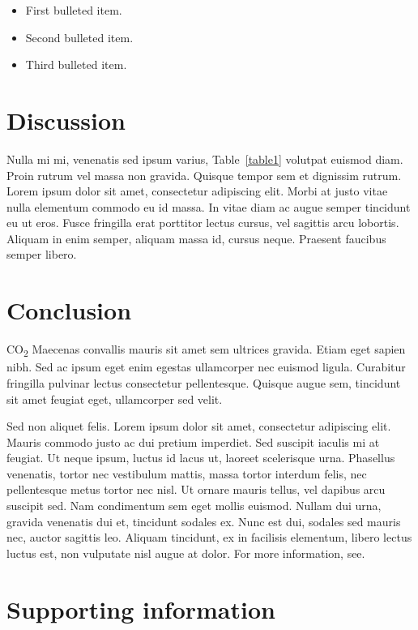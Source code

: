\documentclass[10pt,letterpaper]{article}
\begin{document}
\begin{itemize}
	\item First bulleted item.
	\item Second bulleted item.
	\item Third bulleted item.
\end{itemize}

\section*{Discussion}
Nulla mi mi, venenatis sed ipsum varius, Table~\ref{table1} volutpat euismod diam. Proin rutrum vel massa non gravida. Quisque tempor sem et dignissim rutrum. Lorem ipsum dolor sit amet, consectetur adipiscing elit. Morbi at justo vitae nulla elementum commodo eu id massa. In vitae diam ac augue semper tincidunt eu ut eros. Fusce fringilla erat porttitor lectus cursus, vel sagittis arcu lobortis. Aliquam in enim semper, aliquam massa id, cursus neque. Praesent faucibus semper libero.

\section*{Conclusion}

CO\textsubscript{2} Maecenas convallis mauris sit amet sem ultrices gravida. Etiam eget sapien nibh. Sed ac ipsum eget enim egestas ullamcorper nec euismod ligula. Curabitur fringilla pulvinar lectus consectetur pellentesque. Quisque augue sem, tincidunt sit amet feugiat eget, ullamcorper sed velit. 

Sed non aliquet felis. Lorem ipsum dolor sit amet, consectetur adipiscing elit. Mauris commodo justo ac dui pretium imperdiet. Sed suscipit iaculis mi at feugiat. Ut neque ipsum, luctus id lacus ut, laoreet scelerisque urna. Phasellus venenatis, tortor nec vestibulum mattis, massa tortor interdum felis, nec pellentesque metus tortor nec nisl. Ut ornare mauris tellus, vel dapibus arcu suscipit sed. Nam condimentum sem eget mollis euismod. Nullam dui urna, gravida venenatis dui et, tincidunt sodales ex. Nunc est dui, sodales sed mauris nec, auctor sagittis leo. Aliquam tincidunt, ex in facilisis elementum, libero lectus luctus est, non vulputate nisl augue at dolor. For more information, see.

\section*{Supporting information}
\end{document}
